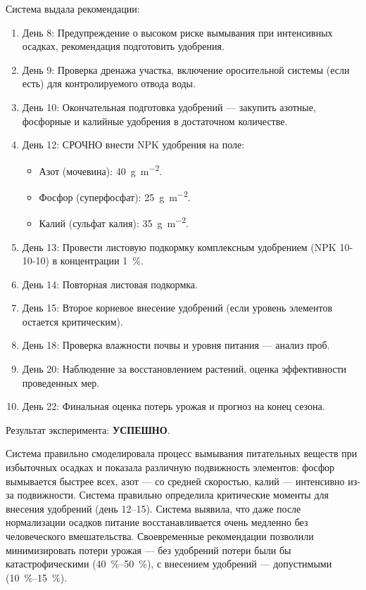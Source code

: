 Система выдала рекомендации:
\begin{enumerate}
    \item День 8: Предупреждение о высоком риске вымывания при интенсивных осадках, рекомендация подготовить удобрения.
    \item День 9: Проверка дренажа участка, включение оросительной системы (если есть) для контролируемого отвода воды.
    \item День 10: Окончательная подготовка удобрений --- закупить азотные, фосфорные и калийные удобрения в достаточном количестве.
    \item День 12: СРОЧНО внести NPK удобрения на поле:
    \begin{itemize}
        \item Азот (мочевина): \SI{40}{\gram\per\square\meter}.
        \item Фосфор (суперфосфат): \SI{25}{\gram\per\square\meter}.
        \item Калий (сульфат калия): \SI{35}{\gram\per\square\meter}.
    \end{itemize}
    \item День 13: Провести листовую подкормку комплексным удобрением (NPK 10-10-10) в концентрации \SI{1}{\percent}.
    \item День 14: Повторная листовая подкормка.
    \item День 15: Второе корневое внесение удобрений (если уровень элементов остается критическим).
    \item День 18: Проверка влажности почвы и уровня питания --- анализ проб.
    \item День 20: Наблюдение за восстановлением растений, оценка эффективности проведенных мер.
    \item День 22: Финальная оценка потерь урожая и прогноз на конец сезона.
\end{enumerate}

Результат эксперимента: \textbf{УСПЕШНО}.

Система правильно смоделировала процесс вымывания питательных веществ при избыточных осадках и показала различную подвижность элементов: фосфор вымывается быстрее всех, азот --- со средней скоростью, калий --- интенсивно из-за подвижности. Система правильно определила критические моменты для внесения удобрений (день 12--15). Система выявила, что даже после нормализации осадков питание восстанавливается очень медленно без человеческого вмешательства. Своевременные рекомендации позволили минимизировать потери урожая --- без удобрений потери были бы катастрофическими (\SIrange{40}{50}{\percent}), с внесением удобрений --- допустимыми (\SIrange{10}{15}{\percent}).


